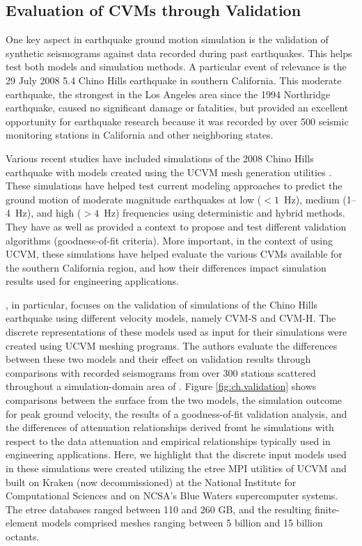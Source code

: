 
\subsection{Evaluation of CVMs through Validation}

One key aspect in earthquake ground motion simulation is the validation of synthetic seismograms against data recorded during past earthquakes. This helps test both models and simulation methods. A particular event of relevance is the 29 July 2008  5.4 Chino Hills earthquake in southern California. This moderate earthquake, the strongest in the Los Angeles area since the 1994 Northridge earthquake, caused no significant damage or fatalities, but provided an excellent opportunity for earthquake research because it was recorded by over 500 seismic monitoring stations in California and other neighboring states. 

Various recent studies have included simulations of the 2008 Chino Hills earthquake with models created using the UCVM mesh generation utilities \citep[e.g.,][]{Olsen_2010_SRL, Taborda_2013_BSSA, Taborda_2014_BSSA}. These simulations have helped test current modeling approaches to predict the ground motion of moderate magnitude earthquakes at low ($<1$~Hz), medium (1--4~Hz), and high ($>4$~Hz) frequencies using deterministic and hybrid methods. They have as well as provided a context to propose and test different validation algorithms (goodness-of-fit criteria). More important, in the context of using UCVM, these simulations have helped evaluate the various CVMs available for the southern California region, and how their differences impact simulation results used for engineering applications.

\citet{Taborda_2014_BSSA}, in particular, focuses on the validation of simulations of the Chino Hills earthquake using different velocity models, namely CVM-S and CVM-H. The discrete representations of these models used as input for their simulations were created using UCVM meshing programs. The authors evaluate the differences between these two models and their effect on validation results through comparisons with recorded seismograms from over 300 stations scattered throughout a simulation-domain area of . Figure \ref{fig:ch.validation} shows comparisons between the surface \vs{} from the two models, the simulation outcome for peak ground velocity, the results of a goodness-of-fit validation analysis, and the differences of attenuation relationships derived fromt he simulations with respect to the data attenuation and empirical relationships typically used in engineering applications. Here, we highlight that the discrete input models used in these simulations were created utilizing the etree MPI utilities of UCVM and built on Kraken (now decommissioned) at the National Institute for Computational Sciences and on NCSA's Blue Waters supercomputer systems. The etree databases ranged between 110 and 260 GB, and the resulting finite-element models comprised meshes ranging between 5 billion and 15 billion octants.

